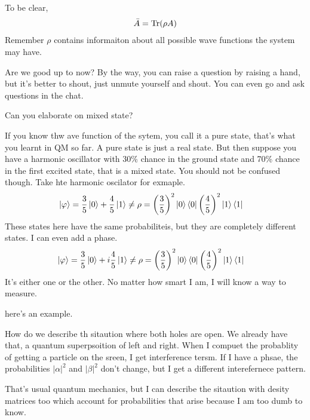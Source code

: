 To be clear,
\begin{align}
    \bar{A} = \Tr(\rho A)
\end{align}
Remember $\rho$ contains informaiton about all possible wave functions the
system may have.

Are we good up to now?
By the way,
you can raise a question by raising a hand,
but it's better to shout,
just unmute yourself and shout.
You can even go and ask questions in the chat.

\begin{question}
    Can you elaborate on mixed state?
\end{question}
If you know thw ave function of the sytem,
you call it a pure state,
that's what you learnt in QM so far.
A pure state is just a real state.
But then suppose you have a harmonic oscillator
with 30\% chance in the ground state and 70\% chance in the first excited state,
that is a mixed state.
You should not be confused though.
Take hte harmonic oscilator for exmaple.
\begin{align}
    \ket{\varphi} &=
    \frac{3}{5}\ket{0}
    + \frac{4}{5}\ket{1}
    \ne
    \rho
    =
    \left( \frac{3}{5} \right)^2 \ket{0}\bra{0}
    \left( \frac{4}{5} \right)^2 \ket{1}\bra{1}
\end{align}
These states here have the same probabiliteis,
but they are completely different states.
I can even add a phase.
\begin{align}
    \ket{\varphi} &=
    \frac{3}{5}\ket{0}
    + i\frac{4}{5}\ket{1}
    \ne
    \rho
    =
    \left( \frac{3}{5} \right)^2 \ket{0}\bra{0}
    \left( \frac{4}{5} \right)^2 \ket{1}\bra{1}
\end{align}
It's either one or the other.
No matter how smart I am,
I will know a way to measure.

here's an example.

How do we describe th sitaution where both holes are open.
We already have that,
a quantum superpsoition of left and right.
When I compuet the probablity of getting a particle on the sreen,
I get interference tersm.
If I have a phsae,
the probabilities $|\alpha|^2$ and $|\beta|^2$ don't change,
but I get a different interefernece pattern.

That's usual quantum mechanics,
but I can describe the sitaution with desity matrices too
which account for probabilities that arise because I am too dumb to know.


